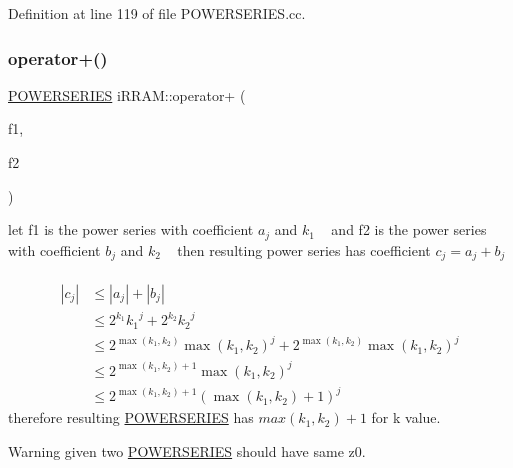 Definition at line 119 of file P\+O\+W\+E\+R\+S\+E\+R\+I\+E\+S.\+cc.


\begin{DoxyCode}{0}

\end{DoxyCode}
\mbox{\label{namespacei_r_r_a_m_a8b1db00c78d93c9f6cc4f98c83e875ec}} 
\subsubsection{\texorpdfstring{operator+()}{operator+()}}
{\footnotesize\ttfamily \mbox{\hyperlink{classi_r_r_a_m_1_1_p_o_w_e_r_s_e_r_i_e_s}{P\+O\+W\+E\+R\+S\+E\+R\+I\+ES}} i\+R\+R\+A\+M\+::operator+ (\begin{DoxyParamCaption}\item[{const \mbox{\hyperlink{classi_r_r_a_m_1_1_p_o_w_e_r_s_e_r_i_e_s}{P\+O\+W\+E\+R\+S\+E\+R\+I\+ES}} \&}]{f1,  }\item[{const \mbox{\hyperlink{classi_r_r_a_m_1_1_p_o_w_e_r_s_e_r_i_e_s}{P\+O\+W\+E\+R\+S\+E\+R\+I\+ES}} \&}]{f2 }\end{DoxyParamCaption})}

let f1 is the power series with coefficient $ a_j $ and $ k_1 $ ~\newline
and f2 is the power series with coefficient $ b_j $ and $ k_2 $ ~\newline
then resulting power series has coefficient $ c_j = a_j + b_j $ ~\newline
 \begin{align*} |c_j| &\leq |a_j| + |b_j|\\ &\leq 2^{k_1} {k_1}^j + 2^{k_2} {k_2}^j \\ &\leq 2^{\max(k_1,k_2)} {\max(k_1,k_2)}^j + 2^{\max(k_1,k_2)} {\max(k_1,k_2)}^j \\ &\leq 2^{\max(k_1,k_2) +1} {\max(k_1,k_2)}^j \\ &\leq 2^{\max(k_1,k_2)+1} (\max(k_1,k_2)+1)^j \end{align*} therefore resulting \mbox{\hyperlink{classi_r_r_a_m_1_1_p_o_w_e_r_s_e_r_i_e_s}{P\+O\+W\+E\+R\+S\+E\+R\+I\+ES}} has $ max(k_1, k_2)+1 $ for k value.~\newline
\begin{DoxyWarning}{Warning}
given two \mbox{\hyperlink{classi_r_r_a_m_1_1_p_o_w_e_r_s_e_r_i_e_s}{P\+O\+W\+E\+R\+S\+E\+R\+I\+ES}} should have same z0. 
\end{DoxyWarning}


